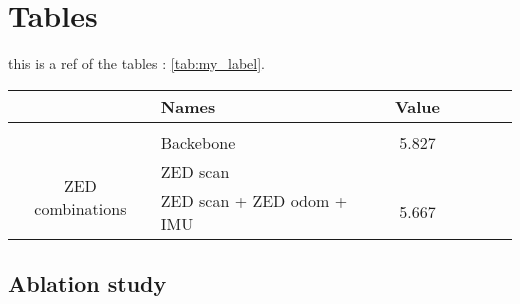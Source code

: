 \documentclass[10pt,twocolumn,letterpaper]{article}
\begin{document}
\section{Tables}
this is a ref of the tables : \cref{tab:my_label}.
\begin{table*}[ht] %
    \centering
    \begin{tabular}{clccccc} %
    \hline
    & Names & Value \\
    \hline
    \multirow{2}{*}{}  \\
    &Backebone& 5.827 \\
   \multirow{3}{*}{ZED combinations} &ZED scan \\
    
    &ZED scan + ZED odom + IMU& 5.667\\
    \hline
    \end{tabular}
    \caption{Caption}
    \label{tab:my_label}
\end{table*}

\subsection{Ablation study}
\end{document}
